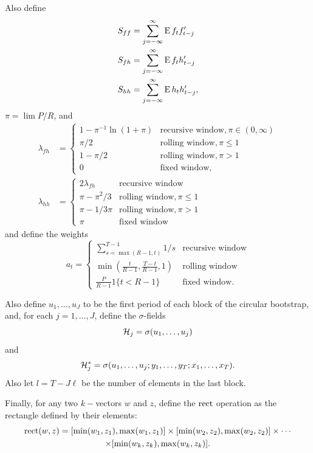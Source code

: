 \documentclass[12pt,fleqn]{article}
\begin{document}
Also define
\begin{align*}
  S_{ff} &= \sum_{j=-\infty}^\infty \operatorname{E} f_t f_{t-j}' \\
  S_{fh} &= \sum_{j=-\infty}^\infty \operatorname{E} f_t h_{t-j}' \\
  S_{hh} &= \sum_{j=-\infty}^\infty \operatorname{E} h_t h_{t-j}',
\end{align*}
$\pi = \lim P/R$, and
\begin{align*}
  \lambda_{fh} &=
  \begin{cases}
    1 - \pi^{-1} \ln(1 + \pi) & \text{recursive window}, \pi \in (0, \infty) \\
    \pi / 2 & \text{rolling window}, \pi \leq 1 \\
    1 - \pi / 2 & \text{rolling window}, \pi > 1 \\
    0 & \text{fixed window},
  \end{cases} \\
  \lambda_{hh} &=
  \begin{cases}
    2 \lambda_{fh} & \text{recursive window} \\
    \pi - \pi^2/3 & \text{rolling window}, \pi \leq 1 \\
    \pi - 1/3\pi & \text{rolling window} , \pi > 1 \\
    \pi & \text{fixed window}
  \end{cases}
\end{align*}
and define the weights
\begin{equation}\label{eq:1}
  a_t =
  \begin{cases}
    \sum_{s=\max(R-1, t)}^{T-1} 1/s & \text{recursive window} \\
    \min(\tfrac{t}{R-1}, \tfrac{T - t}{R-1}, 1) & \text{rolling window} \\
    \tfrac{P}{R-1} 1\{t < R-1\} &  \text{fixed window}.
  \end{cases}
\end{equation}

Also define $u_1,\dots,u_J$ to be the first period of each
block of the circular bootstrap, and, for each $j = 1,\dots,J$,
define the $\sigma$-fields
\[
\mathcal{H}_j = \sigma(u_1,\dots,u_j)
\]
and
\[
\mathcal{H}_j^* = \sigma(u_1,\dots,u_j; y_1,\dots,y_T; x_1,\dots,x_T).
\]
Also let $l = T - J \ell$ be the number of elements in the last block.

Finally, for any two $k-$vectors $w$ and $z$, define the $\operatorname{rect}$
operation as the rectangle defined by their elements:
\begin{multline*}
  \operatorname{rect}(w, z) = [\min(w_1, z_1), \max(w_1, z_1)] \times
  [\min(w_2, z_2), \max(w_2, z_2)] \times \cdots \\ \times
  [\min(w_k, z_k), \max(w_k, z_k)].
\end{multline*}
\end{document}
